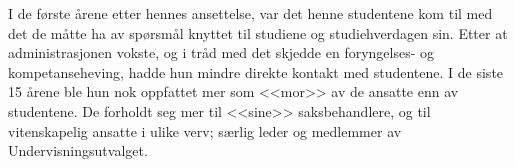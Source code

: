 I de første årene etter hennes ansettelse, var det henne studentene kom til med det de måtte ha av spørsmål knyttet til studiene og studiehverdagen sin. Etter at administrasjonen vokste, og i tråd med det skjedde en foryngelses- og kompetanseheving, hadde hun mindre direkte kontakt med studentene. I de siste 15 årene ble hun nok oppfattet mer som <<mor>> av de ansatte enn av studentene. De forholdt seg mer til <<sine>> saksbehandlere, og til vitenskapelig ansatte i ulike verv; særlig leder og medlemmer av Undervisningsutvalget.
